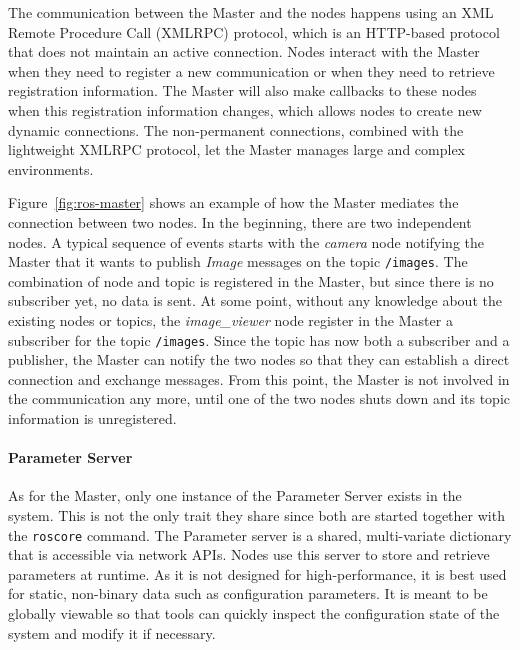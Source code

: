 The communication between the Master and the nodes happens using an XML Remote Procedure Call (XMLRPC) protocol, which is an HTTP-based protocol that does not maintain an active connection. Nodes interact with the Master when they need to register a new communication or when they need to retrieve registration information. The Master will also make callbacks to these nodes when this registration information changes, which allows nodes to create new dynamic connections. The non-permanent connections, combined with the lightweight XMLRPC protocol, let the Master manages large and complex environments.

Figure~\ref{fig:ros-master} shows an example of how the Master mediates the connection between two nodes. In the beginning, there are two independent nodes. A typical sequence of events starts with the \textit{camera} node notifying the Master that it wants to publish \textit{Image} messages on the topic \texttt{/images}. The combination of node and topic is registered in the Master, but since there is no subscriber yet, no data is sent. At some point, without any knowledge about the existing nodes or topics, the \textit{image\_viewer} node register in the Master a subscriber for the topic \texttt{/images}. Since the topic has now both a subscriber and a publisher, the Master can notify the two nodes so that they can establish a direct connection and exchange messages. From this point, the Master is not involved in the communication any more, until one of the two nodes shuts down and its topic information is unregistered.

\paragraph{Parameter Server}  As for the Master, only one instance of the Parameter Server exists in the system. This is not the only trait they share since both are started together with the \texttt{roscore} command. The Parameter server is a shared, multi-variate dictionary that is accessible via network APIs. Nodes use this server to store and retrieve parameters at runtime. As it is not designed for high-performance, it is best used for static, non-binary data such as configuration parameters. It is meant to be globally viewable so that tools can quickly inspect the configuration state of the system and modify it if necessary.

